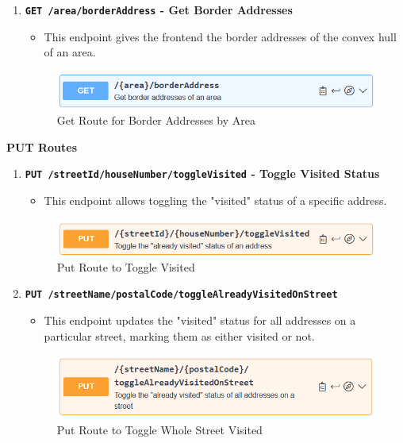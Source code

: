 \begin{enumerate}
        \item \textbf{\texttt{GET /{area}/borderAddress} - Get Border Addresses}
        \begin{itemize}
            \item This endpoint gives the frontend the border addresses of the convex hull of an area.
        \end{itemize} 
        \begin{figure} [H]
            \centering
            \includegraphics [width=1\textwidth] {images/andreas/praxis/getBorderAddressesOfArea.png}
            \caption{Get Route for Border Addresses by Area}
        \end{figure}
    \end{enumerate}    

    \textbf{PUT Routes}

    \begin{enumerate}    
        \item \textbf{\texttt{PUT /{streetId}/{houseNumber}/toggleVisited} - Toggle Visited Status}
        \begin{itemize}
            \item This endpoint allows toggling the "visited" status of a specific address.
        \end{itemize} 
        \begin{figure} [H]
            \centering
            \includegraphics [width=1\textwidth] {images/andreas/praxis/toggleAlreadyVisitedOfAddress.png}
            \caption{Put Route to Toggle Visited}
        \end{figure}

        \item \textbf{\texttt{PUT /{streetName}/{postalCode}/toggleAlreadyVisitedOnStreet}}
        \begin{itemize}
            \item This endpoint updates the "visited" status for all addresses on a particular street, marking them as either visited or not.
        \end{itemize} 
        \begin{figure} [H]
            \centering
            \includegraphics [width=1\textwidth] {images/andreas/praxis/toggleAlreadyVisitedOfAddressesOnStreet.png}
            \caption{Put Route to Toggle Whole Street Visited}
        \end{figure}

        
    \end{enumerate}

